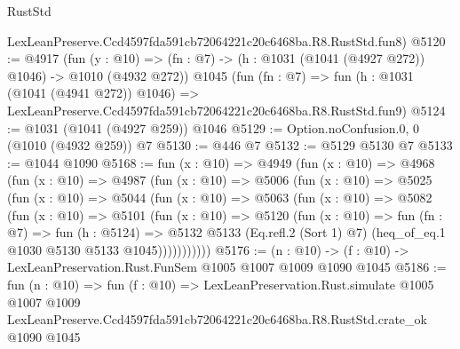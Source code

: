 \begin{lexlean}{RustStd}
\begin{coremodule}
    LexLeanPreserve.Ccd4597fda591cb72064221c20c6468ba.R8.RustStd.fun8)
@5120 := @4917
    (fun (y : @10) => (fn : @7) -> (h : @1031 (@1041 (@4927 @272)) @1046) -> @1010 (@4932 @272))
    @1045
    (fun (fn : @7) =>
    fun (h : @1031 (@1041 (@4941 @272)) @1046) =>
    LexLeanPreserve.Ccd4597fda591cb72064221c20c6468ba.R8.RustStd.fun9)
@5124 := @1031 (@1041 (@4927 @259)) @1046
@5129 := Option.noConfusion.{0, 0} (@1010 (@4932 @259)) @7
@5130 := @446 @7
@5132 := @5129 @5130 @7
@5133 := @1044 @1090
@5168 := fun (x : @10) =>
  @4949
    (fun (x : @10) =>
    @4968
      (fun (x : @10) =>
      @4987
        (fun (x : @10) =>
        @5006
          (fun (x : @10) =>
          @5025
            (fun (x : @10) =>
            @5044
              (fun (x : @10) =>
              @5063
                (fun (x : @10) =>
                @5082
                  (fun (x : @10) =>
                  @5101
                    (fun (x : @10) =>
                    @5120
                      (fun (x : @10) =>
                      fun (fn : @7) =>
                      fun (h : @5124) =>
                      @5132
                        @5133
                        (Eq.refl.{2} (Sort 1) @7)
                        (heq_of_eq.{1} @1030 @5130 @5133 @1045)))))))))))
@5176 := (n : @10) -> (f : @10) -> LexLeanPreservation.Rust.FunSem @1005 @1007 @1009 @1090 @1045
@5186 := fun (n : @10) =>
  fun (f : @10) =>
  LexLeanPreservation.Rust.simulate
    @1005
    @1007
    @1009
    LexLeanPreserve.Ccd4597fda591cb72064221c20c6468ba.R8.RustStd.crate_ok
    @1090
    @1045
\end{coremodule}
\end{lexlean}
